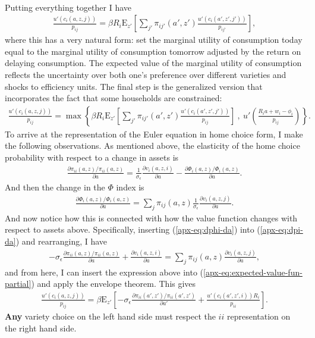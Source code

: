 \documentclass[12pt,pdftex]{article}
\begin{document}
\begin{onehalfspacing}
\begin{align}
\end{align}
Putting everything together I have
\begin{align}
\frac{u'(c_{i}(a, z, j))}{p_{ij}} = \beta R_{i} \mathrm{E}_{z'} \left[ \sum_{j'} \pi_{ij'}(a', z') \frac{u'(c_{i}(a', z',j'))}{p_{ij'}} \right],
\label{apx-eq:euler}
\end{align}
where this has a very natural form: set the marginal utility of consumption today equal to the marginal utility of consumption tomorrow adjusted by the return on delaying consumption. The expected value of the marginal utility of consumption reflects the uncertainty over both one's preference over different varieties and shocks to efficiency units. The final step is the generalized version that incorporates the fact that some households are constrained:
\begin{align}
\frac{u'(c_{i}(a, z, j))}{p_{ij}} = \max \left\{ \beta R_{i} \mathrm{E}_{z'} \left[ \sum_{j'} \pi_{ij'}(a', z') \frac{u'(c_{i}(a', z', j'))}{p_{ij}} \right] \ , \  u' \left( \frac{R_i a + w_i - \phi_{i}}{p_{ij}} \right) \right \}.
\label{eq:apx-euler-equation}
\end{align}
To arrive at the representation of the Euler equation in home choice form, I make the following observations. As mentioned above, the elasticity of the home choice probability with respect to a change in assets is
\begin{align}
\frac{\partial \pi_{ii}(a,z) / \pi_{ii}(a,z) }{\partial a} = \frac{1}{\sigma_{\epsilon}}\frac{\partial v_{i}(a,z,i)}{\partial a} - \frac{\partial \Phi_{i}(a,z) / \Phi_{i}(a,z)}{\partial a}.
\label{apx-eq:dpi-da}
\end{align}
And then the change in the $\Phi$ index is
\begin{align}
\frac{\partial \Phi_{i}(a,z) / \Phi_{i}(a,z)}{\partial a} = \sum_{j} \pi_{ij}(a,z) \frac{1}{\sigma_{\epsilon}}\frac{\partial v_{i}(a,z,j)}{\partial a}.
\label{apx-eq:dphi-da}
\end{align}
And now notice how this is connected with how the value function changes with respect to assets above. Specifically, inserting (\ref{apx-eq:dphi-da}) into (\ref{apx-eq:dpi-da}) and rearranging, I have
\begin{align}
-\sigma_{\epsilon} \frac{\partial \pi_{ii}(a,z) / \pi_{ii}(a,z) }{\partial a} + \frac{\partial v_{i}(a,z,i)}{\partial a} =
\sum_{j} \pi_{ij}(a,z) \frac{\partial v_{i}(a,z,j)}{\partial a},
\end{align}
and from here, I can insert the expression above into (\ref{apx-eq:expected-value-fun-partial}) and apply the envelope theorem. This gives
\begin{align}
\frac{u'(c_{i}(a, z, j))}{p_{ij}} = \beta \mathrm{E}_{z'} \left[ -\sigma_{\epsilon} \frac{\partial \pi_{ii}(a',z') / \pi_{ii}(a',z')}{\partial a'} + \frac{u'(c_{i}(a', z', i))R_i}{p_{ii}} \right].
\label{apx-eq:homechoice-euler}
\end{align}
\textbf{Any} variety choice on the left hand side must respect the $ii$ representation on the right hand side. 


\end{onehalfspacing}
\end{document}
